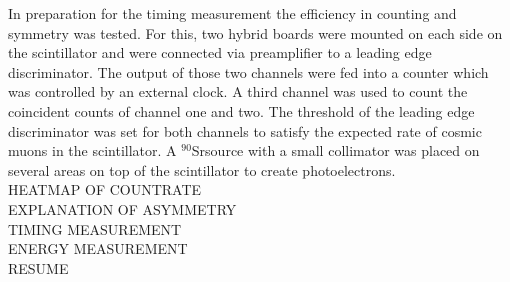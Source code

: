 \documentclass[%
 reprint,
 amsmath,amssymb,
 aps,
]{revtex4-1}
\newcommand{\sr}{$^{90}$Sr}
\begin{document}
In preparation for the timing measurement the efficiency in counting and symmetry was tested. For this, two hybrid boards were mounted on each side on the scintillator and were connected via preamplifier to a leading edge discriminator. The output of those two channels were fed into a counter which was controlled by an external clock. A third channel was used to count the coincident counts of channel one and two. The threshold of the leading edge discriminator was set for both channels to satisfy the expected rate of cosmic muons in the scintillator. A \sr source with a small collimator was placed on several areas on top of the scintillator to create photoelectrons. \\
HEATMAP OF COUNTRATE \\
EXPLANATION OF ASYMMETRY \\
TIMING MEASUREMENT \\
ENERGY MEASUREMENT \\
RESUME 
     





\end{document}

